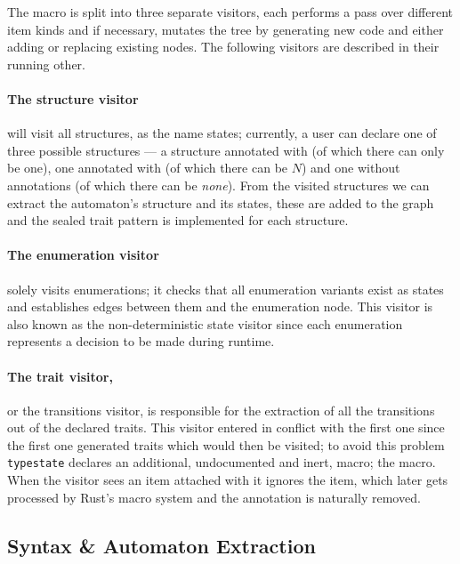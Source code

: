 The macro is split into three separate visitors, each performs a pass over different item kinds and if necessary,
mutates the tree by generating new code and either adding or replacing existing nodes.
The following visitors are described in their running other.

\paragraph{The structure visitor} will visit all structures, as the name states;
currently, a user can declare one of three possible structures ---
a structure annotated with  (of which there can only be one),
one annotated with  (of which there can be $N$)
and one without annotations (of which there can be \emph{none}).
From the visited structures we can extract the automaton's structure and its states,
these are added to the graph and the sealed trait pattern is implemented for each structure.

\paragraph{The enumeration visitor} solely visits enumerations;
it checks that all enumeration variants exist as states and establishes edges between them and the enumeration node.
This visitor is also known as the non-deterministic state visitor since each enumeration represents a decision to be made during runtime.

\paragraph{The trait visitor,} or the transitions visitor,
is responsible for the extraction of all the transitions out of the declared traits.
This visitor entered in conflict with the first one since the first one generated traits which would then be visited;
to avoid this problem \texttt{typestate} declares an additional, undocumented and inert, macro;
the  macro.
When the visitor sees an item attached with  it ignores the item,
which later gets processed by Rust's macro system and the annotation is naturally removed. %



\subsection{Syntax \& Automaton Extraction}\label{sec:macro-dsl:syntax}

